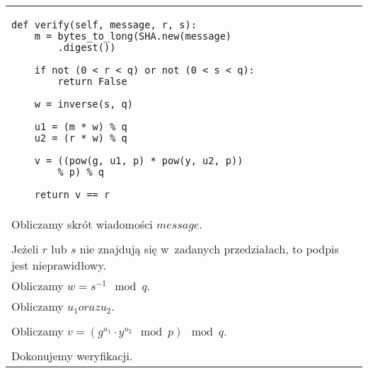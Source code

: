 \documentclass{article}
\begin{document}
        \noindent\begin{table}[ht!]
            \begin{tabular}{lr}
                \begin{minipage}[t]{0.45\textwidth}
                    \begin{verbatim}
def verify(self, message, r, s):
    m = bytes_to_long(SHA.new(message)
        .digest())

    if not (0 < r < q) or not (0 < s < q):
        return False

    w = inverse(s, q)
    
    u1 = (m * w) % q
    u2 = (r * w) % q
    
    v = ((pow(g, u1, p) * pow(y, u2, p)) 
        % p) % q

    return v == r
                    \end{verbatim}
                \end{minipage}
                
                &
        
                \begin{minipage}[t]{0.45\textwidth}                    
                    \noindent \\ Obliczamy skrót wiadomości $message$. \\ \\
                    
                    \noindent Jeżeli $r$ lub $s$ nie znajdują się w~zadanych przedziałach, to podpis jest nieprawidłowy. \\
                    
                    \noindent Obliczamy $w = s^{-1} \mod q$. \\
                    
                    \noindent Obliczamy $u_{1} oraz u_{2}$. \\ \\
                    
                    \noindent Obliczamy $v = (g^{u_{1}} \cdot y^{u_{2}} \mod p) \mod q$. \\ \\
                    
                    \noindent Dokonujemy weryfikacji.
                \end{minipage}
            
                \\
            
            \end{tabular}
        \end{table}
\end{document}
